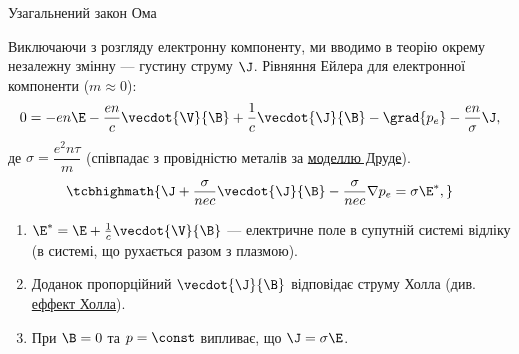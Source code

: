 \documentclass[]{beamer}
\begin{document}
\begin{frame}{Узагальнений закон Ома}{}
	\begin{block}{}
		Виключаючи з розгляду електронну компоненту, ми вводимо в теорію окрему незалежну змінну --- густину струму $\J$. Рівняння Ейлера для електронної компоненти ($m \approx 0$):
		\begin{equation*}
			0 = -en\E - \frac{en}c\vecdot{\V}{\B} + \frac1c \vecdot{\J}{\B} - \grad{p_e} - \frac{en}{\sigma}\J,
		\end{equation*}
		де $\sigma = \dfrac{e^2n\tau}{m}$ (співпадає з провідністю металів за \href{https://en.wikipedia.org/wiki/Drude_model}{моделлю Друде}).
		\begin{equation*}
			\tcbhighmath{
				\J + \frac\sigma{nec} \vecdot{\J}{\B} -  \frac{\sigma}{nec}\nabla p_e = \sigma \E^*,
			}
		\end{equation*}
		\begin{enumerate}\scriptsize
			\item  $\E^* = \E + \frac1c\vecdot{\V}{\B}$ --- електричне поле в супутній системі відліку (в системі, що рухається разом з плазмою).
			\item Доданок пропорційний $\vecdot{\J}{\B}$ відповідає струму Холла (див. \href{https://en.wikipedia.org/wiki/Hall_effect}{еффект Холла}).
			\item При $\B = 0$ та $p = \const$ випливає, що \( \J = \sigma\E \).
		\end{enumerate}
	\end{block}
\end{frame}
\end{document}
